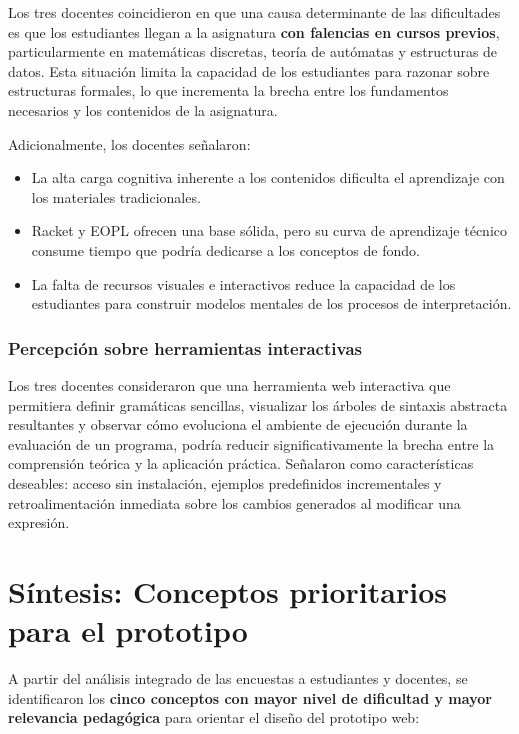 Los tres docentes coincidieron en que una causa determinante de las dificultades es que los estudiantes llegan a la asignatura \textbf{con falencias en cursos previos}, particularmente en matemáticas discretas, teoría de autómatas y estructuras de datos. Esta situación limita la capacidad de los estudiantes para razonar sobre estructuras formales, lo que incrementa la brecha entre los fundamentos necesarios y los contenidos de la asignatura.

Adicionalmente, los docentes señalaron:

\begin{itemize}
    \item La alta carga cognitiva inherente a los contenidos dificulta el aprendizaje con los materiales tradicionales.
    \item Racket y EOPL ofrecen una base sólida, pero su curva de aprendizaje técnico consume tiempo que podría dedicarse a los conceptos de fondo.
    \item La falta de recursos visuales e interactivos reduce la capacidad de los estudiantes para construir modelos mentales de los procesos de interpretación.
\end{itemize}

\subsubsection{Percepción sobre herramientas interactivas}

Los tres docentes consideraron que una herramienta web interactiva que permitiera definir gramáticas sencillas, visualizar los árboles de sintaxis abstracta resultantes y observar cómo evoluciona el ambiente de ejecución durante la evaluación de un programa, podría reducir significativamente la brecha entre la comprensión teórica y la aplicación práctica. Señalaron como características deseables: acceso sin instalación, ejemplos predefinidos incrementales y retroalimentación inmediata sobre los cambios generados al modificar una expresión.

\section{Síntesis: Conceptos prioritarios para el prototipo}

\label{sec:conceptos-prioritarios}

A partir del análisis integrado de las encuestas a estudiantes y docentes, se identificaron los \textbf{cinco conceptos con mayor nivel de dificultad y mayor relevancia pedagógica} para orientar el diseño del prototipo web:

